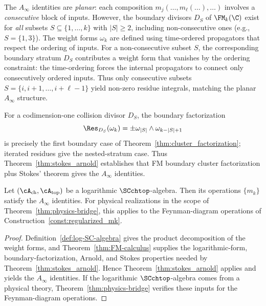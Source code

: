 \begin{remark}
\label{rem:nonconsecutive_vanishing}
The $A_\infty$ identities are \emph{planar}: each composition $m_j(\ldots, m_\ell(\ldots), \ldots)$ involves a \emph{consecutive} block of inputs. However, the boundary divisors $D_S$ of $\FM_k(\C)$ exist for \emph{all} subsets $S \subseteq \{1, \ldots, k\}$ with $|S| \geq 2$, including non-consecutive ones (e.g., $S = \{1,3\}$). The weight forms $\omega_k$ are defined using time-ordered propagators that respect the ordering of inputs. For a non-consecutive subset $S$, the corresponding boundary stratum $D_S$ contributes a weight form that vanishes by the ordering constraint: the time-ordering forces the internal propagators to connect only consecutively ordered inputs. Thus only consecutive subsets $S = \{i, i+1, \ldots, i+\ell-1\}$ yield non-zero residue integrals, matching the planar $A_\infty$ structure.
\end{remark}

\begin{remark}
For a codimension-one collision divisor $D_S$, the boundary
factorization
\[
\Res_{D_S}(\omega_k)=\pm\omega_{|S|}\wedge\omega_{k-|S|+1}
\]
is precisely the first boundary case of Theorem~\ref{thm:cluster_factorization};
iterated residues give the nested-stratum case. Thus
Theorem~\ref{thm:stokes_arnold} establishes that FM boundary cluster
factorization plus Stokes' theorem gives the $A_\infty$ identities.
\end{remark}

\begin{corollary}
Let $(\cA_{\mathrm{ch}},\cA_{\mathrm{top}})$ be a logarithmic $\SCchtop$-algebra.
Then its operations $\{m_k\}$ satisfy the $A_\infty$ identities.
For physical realizations in the scope of Theorem~\ref{thm:physics-bridge},
this applies to the Feynman-diagram operations of Construction~\ref{const:regularized_mk}.
\end{corollary}

\begin{proof}
Definition~\ref{def:log-SC-algebra} gives the product decomposition of the
weight forms, and Theorem~\ref{thm:FM-calculus} supplies the logarithmic-form,
boundary-factorization, Arnold, and Stokes properties needed by
Theorem~\ref{thm:stokes_arnold}. Hence Theorem~\ref{thm:stokes_arnold}
applies and yields the $A_\infty$ identities. If the logarithmic
$\SCchtop$-algebra comes from a physical theory, Theorem~\ref{thm:physics-bridge}
verifies these inputs for the Feynman-diagram operations.
\end{proof}

